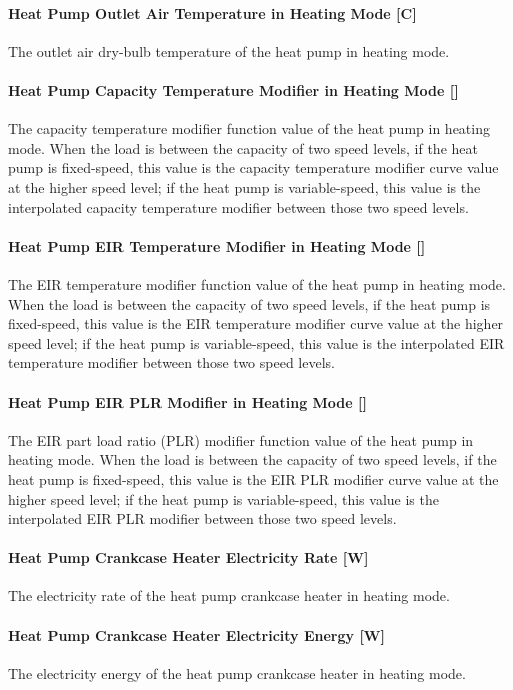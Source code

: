 \paragraph{Heat Pump Outlet Air Temperature in Heating Mode {[}C{]}}
The outlet air dry-bulb temperature of the heat pump in heating mode.
\paragraph{Heat Pump Capacity Temperature Modifier in Heating Mode {[}{]}}
The capacity temperature modifier function value of the heat pump in heating
mode. When the load is between the capacity of two speed levels, if the heat
pump is fixed-speed, this value is the capacity temperature modifier curve value
at the higher speed level; if the heat pump is variable-speed, this value is the
interpolated capacity temperature modifier between those two speed levels.
\paragraph{Heat Pump EIR Temperature Modifier in Heating Mode {[}{]}}
The EIR temperature modifier function value of the heat pump in heating
mode. When the load is between the capacity of two speed levels, if the heat
pump is fixed-speed, this value is the EIR temperature modifier curve value
at the higher speed level; if the heat pump is variable-speed, this value is the
interpolated EIR temperature modifier between those two speed levels.
\paragraph{Heat Pump EIR PLR Modifier in Heating Mode {[}{]}}
The EIR part load ratio (PLR) modifier function value of the heat pump in heating
mode. When the load is between the capacity of two speed levels, if the heat
pump is fixed-speed, this value is the EIR PLR modifier curve value
at the higher speed level; if the heat pump is variable-speed, this value is the
interpolated EIR PLR modifier between those two speed levels.
\paragraph{Heat Pump Crankcase Heater Electricity Rate {[}W{]}} The electricity
rate of the heat pump crankcase heater in heating mode.
\paragraph{Heat Pump Crankcase Heater Electricity Energy {[}W{]}} The
electricity energy of the heat pump crankcase heater in heating mode.
